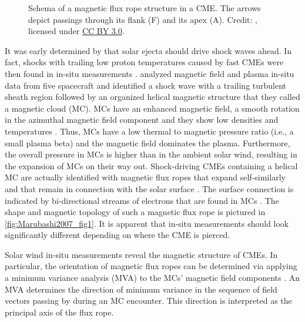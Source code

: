 \begin{figure}[htb]
\begin{floatrow}
{		}{
			\caption[Credit: {\citet[Fig.~1, panel (a)]{Marubashi2007}}, licensed under \href{https://creativecommons.org/licenses/by/3.0/}{CC BY 3.0}.]
			{Schema of a magnetic flux rope structure in a CME. The arrows depict passings through its flank (F) and its apex (A). Credit: {\citet[Fig.~1, panel (a)]{Marubashi2007}}, licensed under \href{https://creativecommons.org/licenses/by/3.0/}{CC BY 3.0}.}
			\label{fig:Marubashi2007_fig1}
		}
	\end{floatrow}
\end{figure}

It was early determined by \citet{Gold1962} that solar ejecta should drive shock waves ahead. In fact, shocks with trailing low proton temperatures caused by fast CMEs were then found in in-situ measurements \citep{Gosling1973,Gosling1974}. \citet{Burlaga1981} analyzed magnetic field and plasma in-situ data from five spacecraft and identified a shock wave with a trailing turbulent sheath region followed by an organized helical magnetic structure that they called a magnetic cloud (MC). MCs have an enhanced magnetic field, a smooth rotation in the azimuthal magnetic field component and they show low densities and temperatures \citep{Burlaga1981}. Thus, MCs have a low thermal to magnetic pressure ratio (i.e., a small plasma beta) and the magnetic field dominates the plasma. Furthermore, the overall pressure in MCs is higher than in the ambient solar wind, resulting in the expansion of MCs on their way out. Shock-driving CMEs containing a helical MC are actually identified with magnetic flux ropes that expand self-similarly and that remain in connection with the solar surface \citep{Chen1997}. The surface connection is indicated by bi-directional streams of electrons that are found in MCs \citep{Gosling1986}. The shape and magnetic topology of such a magnetic flux rope is pictured in \autoref{fig:Marubashi2007_fig1}. It is apparent that in-situ measurements should look significantly different depending on where the CME is pierced.

Solar wind in-situ measurements reveal the magnetic structure of CMEs. In  particular, the orientation of magnetic flux ropes can be determined via applying a minimum variance analysis (MVA) to the MCs' magnetic field components \citep{Sonnerup1967,Burlaga1982}. An MVA determines the direction of minimum variance in the sequence of field vectors passing by during an MC encounter. This direction is interpreted as the principal axis of the flux rope.

